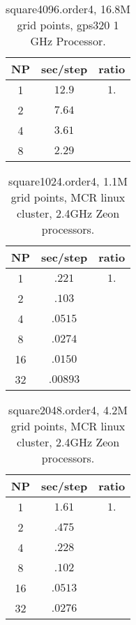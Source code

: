 \documentclass[12pt]{article}
\begin{document}
\begin{table}[hbt]
\begin{center}\footnotesize
\begin{tabular}{|c|c|c|} \hline 
     NP       & sec/step   & ratio \\   \hline\hline 
     1        &  $12.9$    & $ 1. $   \\ 
     2        &  $7.64$    & $    $   \\ 
     4        &  $3.61$    & $    $   \\ \hline 
     8        &  $2.29$    & $    $   \\ \hline 
\end{tabular}		
\end{center}		
\caption{square4096.order4, 16.8M grid points, gps320 1 GHz Processor.}
 \label{tab:box} 
\end{table}

\begin{table}[hbt]
\begin{center}\footnotesize
\begin{tabular}{|c|c|c|} \hline 
     NP       & sec/step   & ratio      \\   \hline\hline 
     1        &  $.221$    & $ 1. $     \\ 
     2        &  $.103$    & $    $     \\ 
     4        &  $.0515$    & $    $     \\
     8        &  $.0274$    & $    $     \\
    16        &  $.0150$   & $    $     \\
    32        &  $.00893$    & $    $     \\ \hline 
\end{tabular}		
\end{center}		
\caption{square1024.order4, 1.1M grid points, MCR linux cluster, 2.4GHz Zeon processors.}
 \label{tab:box} 
\end{table}



\begin{table}[hbt]
\begin{center}\footnotesize
\begin{tabular}{|c|c|c|} \hline 
     NP       & sec/step   & ratio      \\   \hline\hline 
     1        &  $1.61$    & $ 1. $     \\ 
     2        &  $.475$    & $    $     \\ 
     4        &  $.228$    & $    $     \\
     8        &  $.102$    & $    $     \\
    16        &  $.0513$   & $    $     \\
    32        &  $.0276$    & $    $     \\ \hline 
\end{tabular}		
\end{center}		
\caption{square2048.order4, 4.2M grid points, MCR linux cluster, 2.4GHz Zeon processors.}
 \label{tab:box} 
\end{table}
\end{document}
